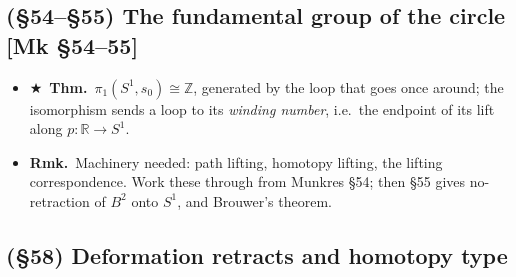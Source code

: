 \documentclass[12pt,a4paper]{article}
\newcommand{\Thm}{\textbf{Thm.}~}
\newcommand{\Rmk}{\textbf{Rmk.}~}
\newcommand{\Key}{$\bigstar$~}                  %
\newcommand{\Mk}[1]{{\footnotesize\textcolor{cue}{[Mk #1]}}}  %
\newenvironment{BL}%
  {\begin{itemize}[leftmargin=1.4em,labelsep=0.55em,itemsep=11pt,topsep=11pt,parsep=0pt]}%
  {\end{itemize}}
\newcommand{\RR}{\mathbb{R}}
\newcommand{\ZZ}{\mathbb{Z}}
\begin{document}
\subsection{(\S54--\S55) The fundamental group of the circle \Mk{\S54--55}}

\begin{BL}
\item \Key\Thm $\pi_1(S^1,s_0)\cong\ZZ$, generated by the loop that goes once around;
      the isomorphism sends a loop to its \emph{winding number}, i.e.\ the endpoint of its lift
      along $p\colon\RR\to S^1$.
\item \Rmk Machinery needed: path lifting, homotopy lifting, the lifting correspondence.
      Work these through from Munkres \S54; then \S55 gives no-retraction of $B^2$ onto $S^1$,
      and Brouwer's theorem.
\end{BL}

\subsection{(\S58) Deformation retracts and homotopy type}
\end{document}
